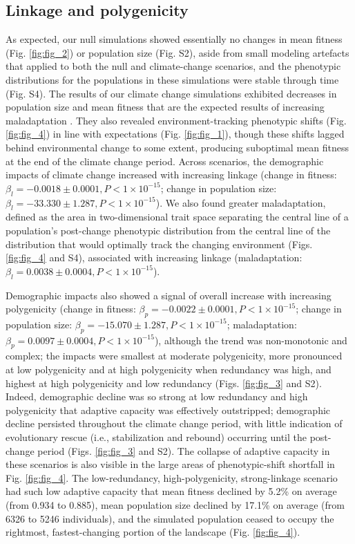 \documentclass[9pt,twocolumn,twoside,lineno]{new_article}
\begin{document}
\subsection*{Linkage and polygenicity}
As expected, our null simulations showed essentially no changes
in mean fitness (Fig. \ref{fig:fig_2}) or population size (Fig. S2), aside from small modeling artefacts that applied to both the 
null and climate-change scenarios, and the phenotypic distributions for the populations in these simulations were
stable through time (Fig. S4).
The results of our climate change simulations exhibited
decreases in population size and mean fitness
that are the expected results of increasing maladaptation \cite{aitken_whitlock}.
They also revealed environment-tracking phenotypic shifts (Fig. \ref{fig:fig_4})
in line with expectations (Fig. \ref{fig:fig_1}),
though these shifts lagged behind environmental change to some extent,
producing suboptimal mean fitness at the end of the climate change period.
Across scenarios, the demographic impacts of
climate change increased with increasing linkage
(change in fitness: $\beta_{l} = -0.0018\pm0.0001, P<1\times10^{-15}$;
change in population size: $\beta_{l} = -33.330\pm1.287, P<1\times10^{-15}$).
We also found greater maladaptation, defined as the area in two-dimensional trait space separating the central line
of a population's post-change phenotypic distribution from the central line of the distribution
that would optimally track the changing environment (Figs. \ref{fig:fig_4} and S4), associated with increasing linkage (maladaptation: $\beta_{l} = 0.0038\pm0.0004, P<1\times10^{-15}$).

Demographic impacts also showed a signal of overall increase with increasing polygenicity
(change in fitness: $\beta_{p} = -0.0022\pm0.0001, P<1\times10^{-15}$;
change in population size: $\beta_{p} = -15.070\pm1.287, P<1\times10^{-15}$;
maladaptation: $\beta_{p} = 0.0097\pm0.0004, P<1\times10^{-15}$),
although the trend was non-monotonic and complex; the impacts were smallest at moderate polygenicity,
more pronounced at low polygenicity and at high polygenicity when redundancy was high,
and highest at high polygenicity and low redundancy (Figs. \ref{fig:fig_3} and S2).
Indeed, demographic decline was so strong at low redundancy and high polygenicity
that adaptive capacity was effectively outstripped; demographic decline persisted throughout
the climate change period, with little indication of evolutionary rescue
(i.e., stabilization and rebound) occurring until the post-change period (Figs. \ref{fig:fig_3} and S2).
The collapse of adaptive capacity in these scenarios
is also visible in the large areas of phenotypic-shift shortfall in Fig. \ref{fig:fig_4}.
The low-redundancy, high-polygenicity, strong-linkage scenario had such low adaptive capacity
that mean fitness declined by 5.2\% on average (from 0.934 to 0.885),
mean population size declined by 17.1\% on average (from 6326 to 5246 individuals),
and the simulated population ceased to occupy the rightmost, fastest-changing portion of the landscape (Fig. \ref{fig:fig_4}).
\end{document}
